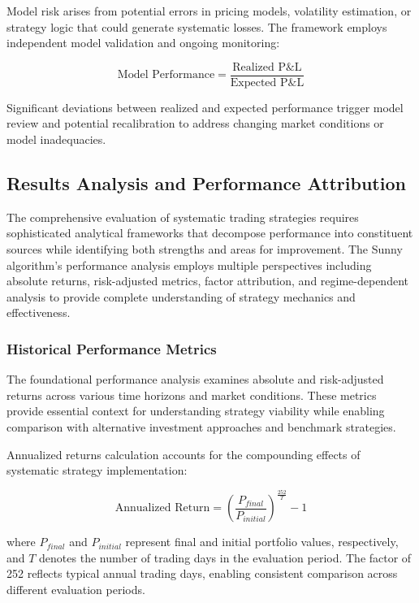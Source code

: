 \documentclass[
  american,
  11pt,
  11pt,
  letterpaper,
  onecolumn]{article}
\begin{document}
Model risk arises from potential errors in pricing models, volatility
estimation, or strategy logic that could generate systematic losses. The
framework employs independent model validation and ongoing monitoring:

\[\text{Model Performance} = \frac{\text{Realized P\&L}}{\text{Expected P\&L}}\]

Significant deviations between realized and expected performance trigger
model review and potential recalibration to address changing market
conditions or model inadequacies.

\subsection{Results Analysis and Performance
Attribution}\label{results-analysis-and-performance-attribution}

The comprehensive evaluation of systematic trading strategies requires
sophisticated analytical frameworks that decompose performance into
constituent sources while identifying both strengths and areas for
improvement. The Sunny algorithm's performance analysis employs multiple
perspectives including absolute returns, risk-adjusted metrics, factor
attribution, and regime-dependent analysis to provide complete
understanding of strategy mechanics and effectiveness.

\subsubsection{Historical Performance
Metrics}\label{historical-performance-metrics}

The foundational performance analysis examines absolute and
risk-adjusted returns across various time horizons and market
conditions. These metrics provide essential context for understanding
strategy viability while enabling comparison with alternative investment
approaches and benchmark strategies.

Annualized returns calculation accounts for the compounding effects of
systematic strategy implementation:

\[\text{Annualized Return} = \left(\frac{P_{final}}{P_{initial}}\right)^{\frac{252}{T}} - 1\]

where \(P_{final}\) and \(P_{initial}\) represent final and initial
portfolio values, respectively, and \(T\) denotes the number of trading
days in the evaluation period. The factor of 252 reflects typical annual
trading days, enabling consistent comparison across different evaluation
periods.
\end{document}
